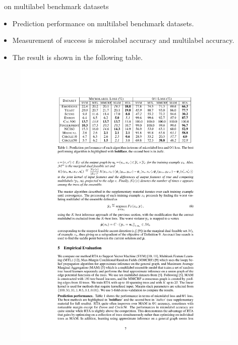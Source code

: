 \documentclass[first=dgreen,second=purple,logo=red]{aaltoslides}
\begin{document}
%
\begin{frame}{\rta\ on multilabel benchmark datasets}
	\begin{itemize}\footnotesize
		\item Prediction performance on multilabel benchmark datasets.
		\item Measurement of success is microlabel accuracy and multilabel accuracy.
		\item The result is shown in the following table.
	\end{itemize}
	\begin{figure}\footnotesize
		\begin{center}
			\includegraphics[width=11cm]{./result_table.pdf}
		\end{center}
	\end{figure}
\end{frame}
\end{document}
